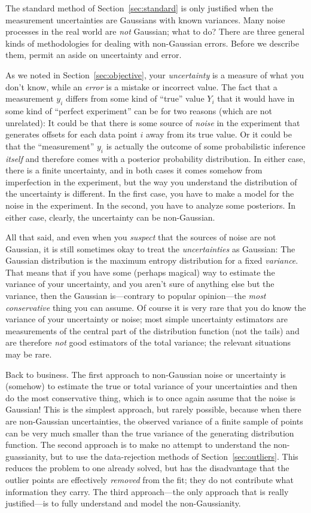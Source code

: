 \documentclass[12pt,twoside]{article}
\newcommand{\sectionname}{Section}
\newcounter{problem}
\begin{document}
The standard method of \sectionname~\ref{sec:standard} is only
justified when the measurement uncertainties are Gaussians with known
variances.  Many noise processes in the real world are \emph{not}
Gaussian; what to do?  There are three general kinds of methodologies
for dealing with non-Gaussian errors.  Before we describe them, permit
an aside on uncertainty and error.

As we noted in \sectionname~\ref{sec:objective}, your
\emph{uncertainty} is a measure of what you don't know, while an
\emph{error} is a mistake or incorrect value.  The fact that a
measurement $y_i$ differs from some kind of ``true'' value $Y_i$ that
it would have in some kind of ``perfect experiment'' can be for two
reasons (which are not unrelated): It could be that there is some
source of \emph{noise} in the experiment that generates offsets for
each data point $i$ away from its true value.  Or it could be that the
``measurement'' $y_i$ is actually the outcome of some probabilistic
inference \emph{itself} and therefore comes with a posterior
probability distribution.  In either case, there is a finite
uncertainty, and in both cases it comes somehow from imperfection in
the experiment, but the way you understand the distribution of the
uncertainty is different.  In the first case, you have to make a model
for the noise in the experiment.  In the second, you have to analyze
some posteriors.  In either case, clearly, the uncertainty can be
non-Gaussian.

All that said, and even when you \emph{suspect} that the sources of
noise are not Gaussian, it is still sometimes okay to treat the
\emph{uncertainties} as Gaussian: The Gaussian distribution is the
maximum entropy distribution for a fixed \emph{variance}.  That means
that if you have some (perhaps magical) way to estimate the variance
of your uncertainty, and you aren't sure of anything else but the
variance, then the Gaussian is---contrary to popular opinion---the
\emph{most conservative} thing you can assume.  Of course it is very
rare that you do know the variance of your uncertainty or noise; most
simple uncertainty estimators are measurements of the central part of
the distribution function (not the tails) and are therefore \emph{not}
good estimators of the total variance; the relevant situations may be
rare.

Back to business.  The first approach to non-Gaussian noise or
uncertainty is (somehow) to estimate the true or total variance of
your uncertainties and then do the most conservative thing, which is
to once again assume that the noise is Gaussian!  This is the simplest
approach, but rarely possible, because when there are non-Gaussian
uncertainties, the observed variance of a finite sample of points can
be very much smaller than the true variance of the generating
distribution function.  The second approach is to make no attempt to
understand the non-guassianity, but to use the data-rejection
methods of \sectionname~\ref{sec:outliers}.
This reduces the problem to one already solved, but has the
disadvantage that the outlier points are effectively \emph{removed}
from the fit; they do not contribute what information they carry.  The
third approach---the only approach that is really justified---is to
fully understand and model the non-Gaussianity.
\end{document}
